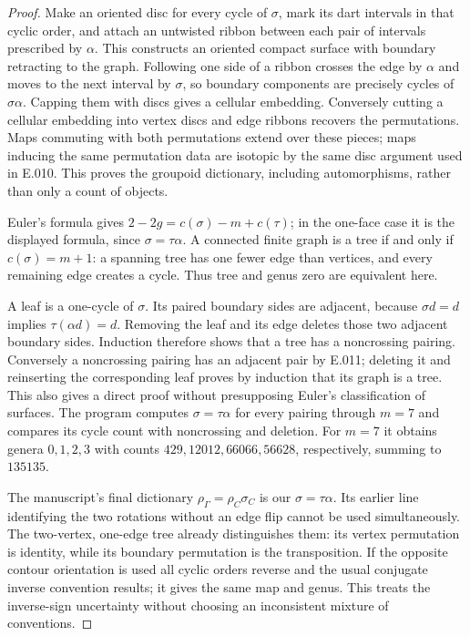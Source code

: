 \begin{proof}
Make an oriented disc for every cycle of $\sigma$, mark its dart intervals
in that cyclic order, and attach an untwisted ribbon between each pair
of intervals prescribed by $\alpha$. This constructs an oriented compact
surface with boundary retracting to the graph. Following one side of a
ribbon crosses the edge by $\alpha$ and moves to the next interval by
$\sigma$, so boundary components are precisely cycles of $\sigma\alpha$.
Capping them with discs gives a cellular embedding. Conversely cutting
a cellular embedding into vertex discs and edge ribbons recovers the
permutations. Maps commuting with both permutations extend over these
pieces; maps inducing the same permutation data are isotopic by the
same disc argument used in E.010. This proves the groupoid dictionary,
including automorphisms, rather than only a count of objects.

Euler's formula gives
$2-2g=c(\sigma)-m+c(\tau)$; in the one-face case it is the displayed
formula, since $\sigma=\tau\alpha$. A connected finite graph is a tree
if and only if $c(\sigma)=m+1$: a spanning tree has one fewer edge than
vertices, and every remaining edge creates a cycle. Thus tree and genus
zero are equivalent here.

A leaf is a one-cycle of $\sigma$. Its paired boundary sides are adjacent,
because $\sigma d=d$ implies $\tau(\alpha d)=d$. Removing the leaf and
its edge deletes those two adjacent boundary sides. Induction therefore
shows that a tree has a noncrossing pairing. Conversely a noncrossing
pairing has an adjacent pair by E.011; deleting it and reinserting the
corresponding leaf proves by induction that its graph is a tree. This
also gives a direct proof without presupposing Euler's classification of
surfaces. The program computes $\sigma=\tau\alpha$ for every pairing
through $m=7$ and compares its cycle count with noncrossing and deletion.
For $m=7$ it obtains genera $0,1,2,3$ with counts
$429,12012,66066,56628$, respectively, summing to $135135$.

The manuscript's final dictionary $\rho_\Gamma=\rho_C\sigma_C$ is
our $\sigma=\tau\alpha$. Its earlier line identifying the two rotations
without an edge flip cannot be used simultaneously. The two-vertex,
one-edge tree already distinguishes them: its vertex permutation is
identity, while its boundary permutation is the transposition. If the
opposite contour orientation is used all cyclic orders reverse and the
usual conjugate inverse convention results; it gives the same map and
genus. This treats the inverse-sign uncertainty without choosing an
inconsistent mixture of conventions.
\end{proof}


